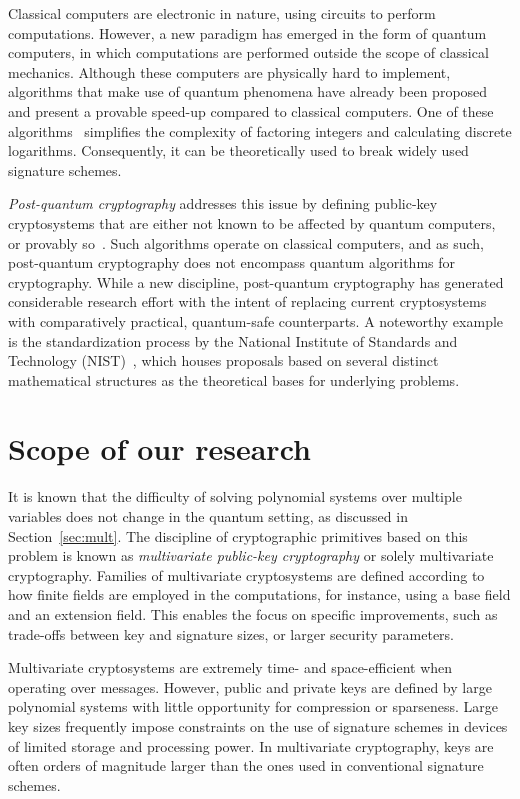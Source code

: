 \documentclass[12pt, a4paper, oneside]{memoir}
\theoremstyle{definition}
\begin{document}
Classical computers are electronic in nature, using circuits to perform computations. However, a new paradigm has emerged in the form of quantum computers, in which computations are performed outside the scope of classical mechanics. Although these computers are physically hard to implement, algorithms that make use of quantum phenomena have already been proposed and present a provable speed-up compared to classical computers. One of these algorithms~\cite{Shor:199710} simplifies the complexity of factoring integers and calculating discrete logarithms. Consequently, it can be theoretically used to break widely used signature schemes.

\emph{Post-quantum cryptography} addresses this issue by defining public-key cryptosystems that are either not known to be affected by quantum computers, or provably so~\cite{Bernstein:2008}. Such algorithms operate on classical computers, and as such, post-quantum cryptography does not encompass quantum algorithms for cryptography. While a new discipline, post-quantum cryptography has generated considerable research effort with the intent of replacing current cryptosystems with comparatively practical, quantum-safe counterparts. A noteworthy example is the standardization process by the National Institute of Standards and Technology (NIST)~\cite{Alagic:201901,Alagic:202007}, which houses proposals based on several distinct mathematical structures as the theoretical bases for underlying problems.

\section{Scope of our research}

It is known that the difficulty of solving polynomial systems over multiple variables does not change in the quantum setting, as discussed in Section~\ref{sec:mult}. The discipline of cryptographic primitives based on this problem is known as \textit{multivariate public-key cryptography} or solely multivariate cryptography. Families of multivariate cryptosystems are defined according to how finite fields are employed in the computations, for instance, using a base field and an extension field. This enables the focus on specific improvements, such as trade-offs between key and signature sizes, or larger security parameters.

Multivariate cryptosystems are extremely time- and space-efficient when operating over messages. However, public and private keys are defined by large polynomial systems with little opportunity for compression or sparseness. Large key sizes frequently impose constraints on the use of signature schemes in devices of limited storage and processing power. In multivariate cryptography, keys are often orders of magnitude larger than the ones used in conventional signature schemes.
\end{document}
